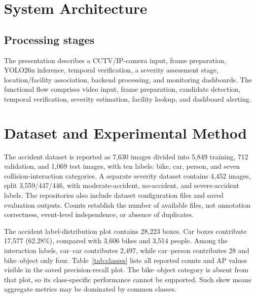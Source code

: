\documentclass[12pt,a4paper]{article}
\begin{document}
\section{System Architecture}
\subsection{Processing stages}
The presentation describes a CCTV/IP-camera input, frame preparation, YOLO26n inference, temporal verification, a severity assessment stage, location/facility association, backend processing, and monitoring dashboards. The functional flow comprises video input, frame preparation, candidate detection, temporal verification, severity estimation, facility lookup, and dashboard alerting.



























\section{Dataset and Experimental Method}
The accident dataset is reported as 7,630 images divided into 5,849 training, 712 validation, and 1,069 test images, with ten labels: bike, car, person, and seven collision-interaction categories. A separate severity dataset contains 4,452 images, split 3,559/447/446, with moderate-accident, no-accident, and severe-accident labels. The repositories also include dataset configuration files and saved evaluation outputs. Counts establish the number of available files, not annotation correctness, event-level independence, or absence of duplicates.

The accident label-distribution plot contains 28,223 boxes. Car boxes contribute 17,577 (62.28\%), compared with 3,606 bikes and 3,514 people. Among the interaction labels, car--car contributes 2,497, while car--person contributes 28 and bike--object only four. Table~\ref{tab:classes} lists all reported counts and AP values visible in the saved precision-recall plot. The bike--object category is absent from that plot, so its class-specific performance cannot be supported. Such skew means aggregate metrics may be dominated by common classes.
\end{document}
